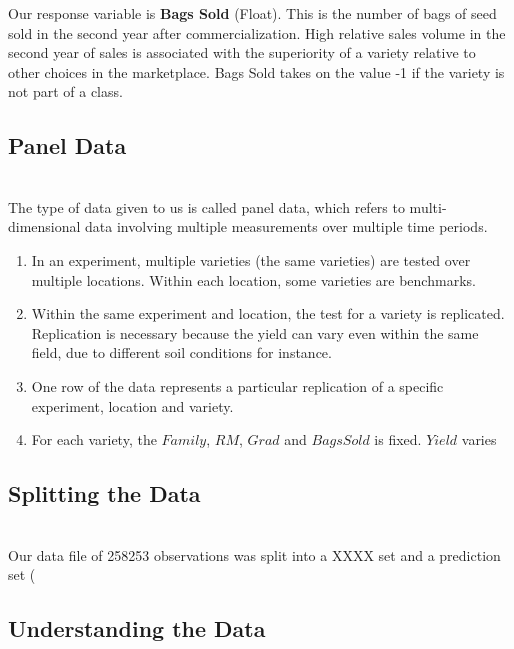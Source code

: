 \documentclass[psamsfonts]{amsart}
\begin{document}
 Our response variable is \textbf{Bags Sold} (Float). This is the number of bags of seed sold in the second year after commercialization. High relative sales volume in the second year of sales is associated with the superiority of a variety relative to other choices in the marketplace. Bags Sold takes on the value -1 if the variety is not part of a class.

\subsection*{Panel Data}
\hfill \\
The type of data given to us is called panel data, which refers to multi-dimensional data involving multiple measurements over multiple time periods.\\
\begin{enumerate}
\item In an experiment, multiple varieties (the same varieties) are tested over multiple locations. Within
each location, some varieties are benchmarks.
\item Within the same experiment and location, the test for a variety is replicated. Replication is necessary
because the yield can vary even within the same field, due to different soil conditions for instance.
\item  One row of the data represents a particular replication of a specific experiment, location and variety.
\item For each variety, the $Family$, $RM$, $Grad$ and $BagsSold$ is fixed. $Yield$ varies
\end{enumerate}



\subsection*{Splitting the Data}
\hfill \\
Our data file of 258253 observations was split into a XXXX set and a prediction set (


\subsection*{Understanding the Data}
\hfill \\
\end{document}
